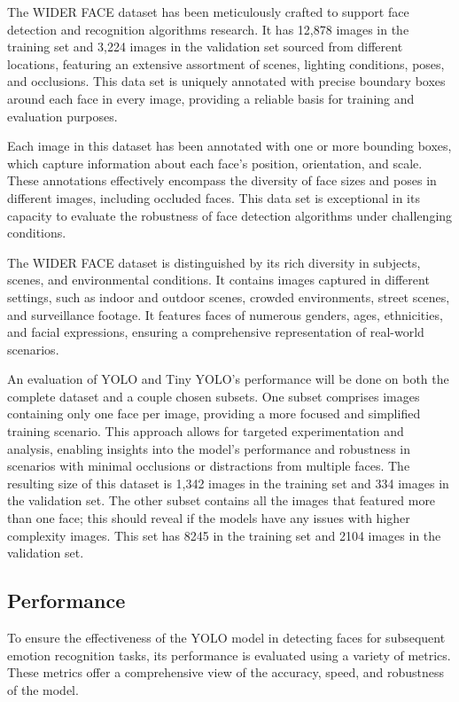 The WIDER FACE dataset has been meticulously crafted to support face detection and recognition algorithms research. It has 12,878 images in the training set and 3,224 images in the validation set sourced from different locations, featuring an extensive assortment of scenes, lighting conditions, poses, and occlusions. This data set is uniquely annotated with precise boundary boxes around each face in every image, providing a reliable basis for training and evaluation purposes.

Each image in this dataset has been annotated with one or more bounding boxes, which capture information about each face's position, orientation, and scale. These annotations effectively encompass the diversity of face sizes and poses in different images, including occluded faces. This data set is exceptional in its capacity to evaluate the robustness of face detection algorithms under challenging conditions.

The WIDER FACE dataset is distinguished by its rich diversity in subjects, scenes, and environmental conditions. It contains images captured in different settings, such as indoor and outdoor scenes, crowded environments, street scenes, and surveillance footage. It features faces of numerous genders, ages, ethnicities, and facial expressions, ensuring a comprehensive representation of real-world scenarios.

An evaluation of YOLO and Tiny YOLO’s performance will be done on both the complete dataset and a couple chosen subsets. One subset comprises images containing only one face per image, providing a more focused and simplified training scenario. This approach allows for targeted experimentation and analysis, enabling insights into the model's performance and robustness in scenarios with minimal occlusions or distractions from multiple faces. The resulting size of this dataset is 1,342 images in the training set and 334 images in the validation set. The other subset contains all the images that featured more than one face; this should reveal if the models have any issues with higher complexity images. This set has 8245 in the training set and 2104 images in the validation set.

\subsection{Performance}

To ensure the effectiveness of the YOLO model in detecting faces for subsequent emotion recognition tasks, its performance is evaluated using a variety of metrics. These metrics offer a comprehensive view of the accuracy, speed, and robustness of the model.


